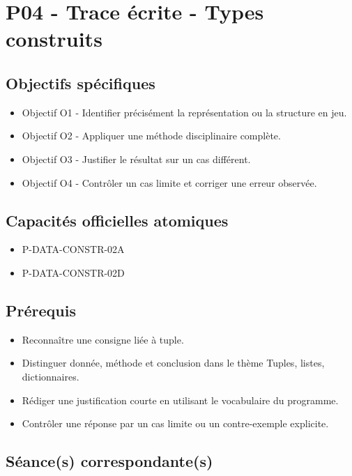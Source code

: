 \section{P04 - Trace écrite - Types construits}

\subsection{Objectifs spécifiques}

\begin{itemize}
\tightlist
\item
  Objectif O1 - Identifier précisément la représentation ou la structure
  en jeu.
\item
  Objectif O2 - Appliquer une méthode disciplinaire complète.
\item
  Objectif O3 - Justifier le résultat sur un cas différent.
\item
  Objectif O4 - Contrôler un cas limite et corriger une erreur observée.
\end{itemize}

\subsection{Capacités officielles atomiques}

\begin{itemize}
\tightlist
\item
  P-DATA-CONSTR-02A
\item
  P-DATA-CONSTR-02D
\end{itemize}

\subsection{Prérequis}

\begin{itemize}
\tightlist
\item
  Reconnaître une consigne liée à tuple.
\item
  Distinguer donnée, méthode et conclusion dans le thème Tuples, listes,
  dictionnaires.
\item
  Rédiger une justification courte en utilisant le vocabulaire du
  programme.
\item
  Contrôler une réponse par un cas limite ou un contre-exemple
  explicite.
\end{itemize}

\subsection{Séance(s) correspondante(s)}

